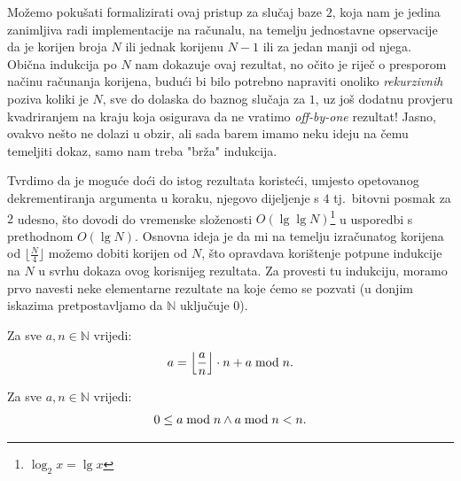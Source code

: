 \documentclass[12pt]{scrartcl}
\begin{document}
Možemo pokušati formalizirati ovaj pristup za slučaj baze $2$, koja nam je jedina zanimljiva radi implementacije na računalu, na temelju
jednostavne opservacije da je korijen broja $N$ ili jednak korijenu $N-1$ ili za jedan manji od njega. Obična indukcija po $N$ nam dokazuje
ovaj rezultat, no očito je riječ o presporom načinu računanja korijena, budući bi bilo potrebno napraviti onoliko \emph{rekurzivnih}
poziva koliki je $N$, sve do dolaska do baznog slučaja za $1$, uz još dodatnu provjeru kvadriranjem na kraju koja osigurava da ne vratimo
\textsl{off-by-one} rezultat! Jasno, ovakvo nešto ne dolazi u obzir, ali sada barem imamo neku ideju na čemu temeljiti dokaz, samo nam treba
"brža" indukcija.

Tvrdimo da je moguće doći do istog rezultata koristeći, umjesto opetovanog dekrementiranja argumenta u koraku, njegovo dijeljenje s $4$
tj.\ bitovni posmak za $2$ udesno, što dovodi do vremenske složenosti $O(\lg\lg N)$\footnote{$\log_2 x=\lg x$} u usporedbi s prethodnom $O(\lg N)$. Osnovna ideja je
da mi na temelju izračunatog korijena od $\lfloor\frac{N}{4}\rfloor$ možemo dobiti korijen od $N$, što opravdava korištenje potpune
indukcije na $N$ u svrhu dokaza ovog korisnijeg rezultata. Za provesti tu indukciju, moramo prvo navesti neke elementarne rezultate
na koje ćemo se pozvati (u donjim iskazima pretpostavljamo da $\mathbb{N}$ uključuje $0$).

\begin{lema}
    Za sve $a,n\in\mathbb{N}$ vrijedi:
    \begin{equation}\label{lm:1}
        a=\left\lfloor\frac{a}{n}\right\rfloor\cdot n + a \bmod n\text.
    \end{equation}
\end{lema}

\begin{lema}
    Za sve $a,n\in\mathbb{N}$ vrijedi:
    \begin{equation}\label{lm:2}
        0 \leq a \bmod n \land a \bmod n < n\text.
    \end{equation}
\end{lema}
\end{document}
